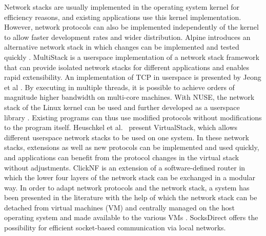 Network stacks are usually implemented in the operating system kernel for efficiency reasons, and existing applications use this kernel implementation. 
However, network protocols can also be implemented independently of the kernel to allow faster development rates and wider distribution. 
Alpine introduces an alternative network stack in which changes can be implemented and tested quickly \cite{A3:ely2001alpine}.
MultiStack \cite{A3:honda2014rekindling} is a userspace implementation of a network stack framework that can provide isolated network stacks for different applications and enables rapid extensibility. 
An implementation of TCP in userspace is presented by Jeong et al \cite{A3:jeong2014mtcp}.
By executing in multiple threads, it is possible to achieve orders of magnitude higher bandwidth on multi-core machines.
With NUSE, the network stack of the Linux kernel can be used and further developed as a userspace library \cite{A3:tazaki2015library}. 
Existing programs can thus use modified protocols without modifications to the program itself.
Heuschkel et al.~\cite{A3:heuschkel2016virtualstack} present VirtualStack, which allows different userspace network stacks to be used on one system. 
In these network stacks, extensions as well as new protocols can be implemented and used quickly, and applications can benefit from the protocol changes in the virtual stack without adjustments. 
ClickNF \cite{A3:gallo2018clicknf} is an extension of a software-defined router in which the lower four layers of the network stack can be exchanged in a modular way. 
In order to adapt network protocols and the network stack, a system has been presented in the literature with the help of which the network stack can be detached from virtual machines (VM) and centrally managed on the host operating system and made available to the various VMs \cite{A3:niu2019netkernel}. 
SocksDirect \cite{A3:li2019socksdirect} offers the possibility for efficient socket-based communication via local networks. 


